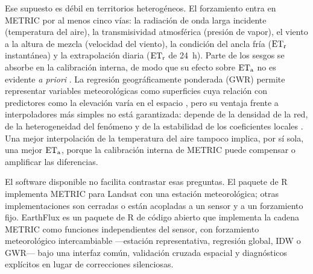 Ese supuesto es débil en territorios heterogéneos. El forzamiento entra en
METRIC por al menos cinco vías: la radiación de onda larga incidente
(temperatura del aire), la transmisividad atmosférica (presión de vapor), el
viento a la altura de mezcla (velocidad del viento), la condición del ancla
fría ($\mathrm{ET_r}$ instantánea) y la extrapolación diaria ($\mathrm{ET_r}$ de 24~h). Parte
de los sesgos se absorbe en la calibración interna, de modo que su efecto
sobre $\mathrm{ET_a}$ no es evidente \emph{a priori}
\parencite{long2011sebalsensitivity,long2013endmember}. La regresión
geográficamente ponderada (GWR) permite representar variables
meteorológicas como superficies cuya relación con predictores como la
elevación varía en el espacio \parencite{brunsdon1996gwr,fotheringham2002gwr},
pero su ventaja frente a interpoladores más simples no está garantizada:
depende de la densidad de la red, de la heterogeneidad del fenómeno y de la
estabilidad de los coeficientes locales
\parencite{wheeler2005multicollinearity,li2014interpolation}. Una mejor
interpolación de la temperatura del aire tampoco implica, por sí sola, una
mejor $\mathrm{ET_a}$, porque la calibración interna de METRIC puede compensar o
amplificar las diferencias.

El software disponible no facilita contrastar esas preguntas. El paquete de
R  \parencite{olmedo2016water} implementa METRIC para Landsat con
una estación meteorológica; otras implementaciones son cerradas o están
acopladas a un sensor y a un forzamiento fijo. EarthFlux
\parencite{fuentesjaque2026earthflux} es un paquete de R de código abierto
que implementa la cadena METRIC como funciones independientes del sensor,
con forzamiento meteorológico intercambiable ---estación representativa,
regresión global, IDW o GWR--- bajo una interfaz común, validación cruzada
espacial y diagnósticos explícitos en lugar de correcciones silenciosas.


